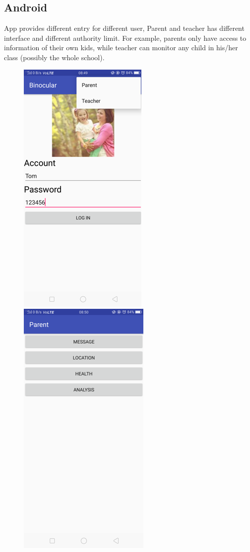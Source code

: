 \documentclass{article}
\begin{document}
\subsection{Android}

 App provides different entry for different user, Parent and teacher has different interface and different authority limit. For example, parents only have access to information of their own kids, while teacher can monitor any child in his/her class (possibly the whole school).
 
\begin{figure}[htbp]
	\centering
	\begin{minipage}[t]{0.30\linewidth}
		\includegraphics{img/Picture1}
	\end{minipage}
	\begin{minipage}[t]{0.30\linewidth}
		\includegraphics{img/Picture2}

\end{minipage}
\end{figure}
\end{document}
